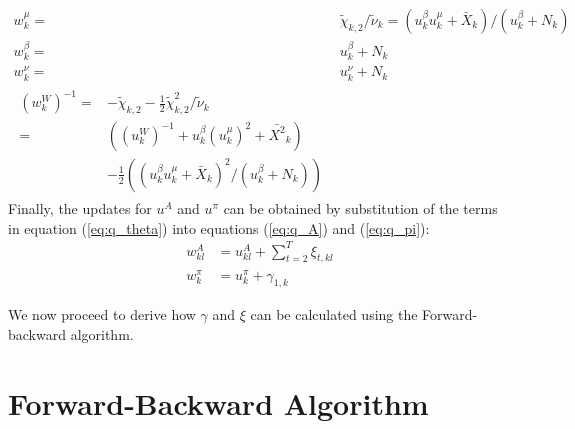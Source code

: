 \begin{align}
  w^\mu_{k} =& \tilde{\chi}_{k,2} / \tilde{\nu}_{k} 
         = (u^\beta_k u^\mu_k + \bar{X}_{k})/(u^\beta_k + N_{k}) \\
  w^\beta_{k} =& u^{\beta}_k + N_{k} \\
  w^\nu_{k} =& u^{\nu}_k + N_{k} \\
  \begin{split}
    (w^W_{k})^{-1} 
    =& 
      - \tilde{\chi}_{k,2} 
      - \tfrac{1}{2} \tilde{\chi}_{k,2}^2/\tilde{\nu}_{k} \\
    =&
    \left(
      (u^{W}_k)^{-1} + u^\beta_k (u^\mu_k)^2 + \bar{X^2}_{k}
    \right) \\
    &- \frac{1}{2}
      \left(
      (u^\beta_k u^\mu_k + \bar{X}_{k})^2
      /(u^\beta_k + N_{k})
      \right)
  \end{split}
\end{align}
Finally, the updates for $u^A$ and $u^\pi$ can be obtained by substitution of the terms in equation (\ref{eq:q_theta}) into equations (\ref{eq:q_A}) and (\ref{eq:q_pi}):
\begin{align}
  w^A_{kl} &= u^A_{kl} + \sum_{t=2}^{T} \xi_{t,kl} \\
  w^\pi_{k} &= u^\pi_{k} + \gamma_{1,k}
\end{align}

We now proceed to derive how $\gamma$ and $\xi$ can be calculated using the Forward-backward algorithm.

\section{Forward-Backward Algorithm}

